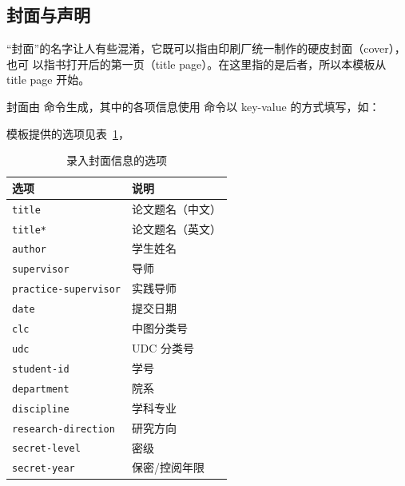 \documentclass[a4paper]{ltxdoc}
\DeclareRobustCommand\opt{\texttt}
\begin{document}
\subsection{封面与声明}

“封面”的名字让人有些混淆，它既可以指由印刷厂统一制作的硬皮封面（cover），也可
以指书打开后的第一页（title page）。在这里指的是后者，所以本模板从 title page
开始。

\DescribeMacro{\maketitle}
封面由  命令生成，其中的各项信息使用  命令以
key-value 的方式填写，如：
\begin{latex}
\end{latex}
模板提供的选项见表~\ref{tab:title-page-options}，
\begin{table}
  \centering\small
  \caption{录入封面信息的选项}
  \label{tab:title-page-options}
  \begin{tabular}{ll}
    \toprule
    选项                      & 说明             \\
    \midrule
    \opt{title}               & 论文题名（中文） \\
    \opt{title*}              & 论文题名（英文） \\
    \opt{author}              & 学生姓名         \\
    \opt{supervisor}          & 导师             \\
    \opt{practice-supervisor} & 实践导师         \\
    \opt{date}                & 提交日期         \\
    \opt{clc}                 & 中图分类号       \\
    \opt{udc}                 & UDC 分类号       \\
    \opt{student-id}          & 学号             \\
    \opt{department}          & 院系             \\
    \opt{discipline}          & 学科专业         \\
    \opt{research-direction}  & 研究方向         \\
    \opt{secret-level}        & 密级             \\
    \opt{secret-year}         & 保密/控阅年限    \\
    \bottomrule
  \end{tabular}
\end{table}
\end{document}
